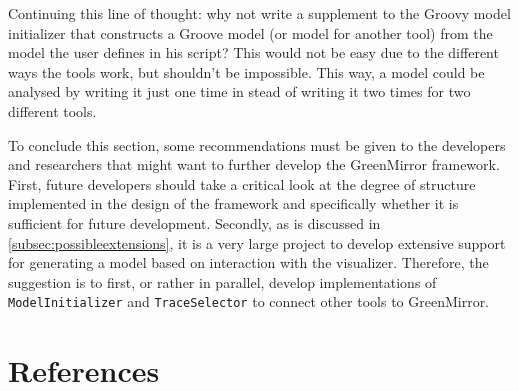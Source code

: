 \documentclass[a4paper]{article}
\begin{document}
	Continuing this line of thought: why not write a supplement to the Groovy model initializer that constructs a Groove model (or model for another tool) from the model the user defines in his script? This would not be easy due to the different ways the tools work, but shouldn't be impossible. This way, a model could be analysed by writing it just one time in stead of writing it two times for two different tools.
	
	To conclude this section, some recommendations must be given to the developers and researchers that might want to further develop the GreenMirror framework. First, future developers should take a critical look at the degree of structure implemented in the design of the framework and specifically whether it is sufficient for future development. Secondly, as is discussed in \cref{subsec:possibleextensions}, it is a very large project to develop extensive support for generating a model based on interaction with the visualizer. Therefore, the suggestion is to first, or rather in parallel, develop implementations of \lstinline{ModelInitializer} and \lstinline{TraceSelector} to connect other tools to GreenMirror.
	
	
	

	
	
	\section{References}
	
	
	
	
	
	\appendix
	
\end{document}
